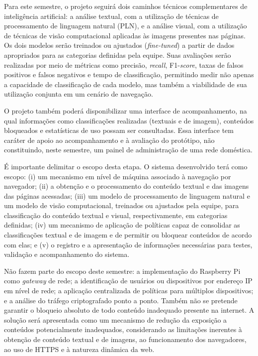 \documentclass[
    12pt,           %
    oneside,        %
    a4paper,        %
    chapter=TITLE,  %
    english,        %
    brazil          %
]{abntex2}
\begin{document}
Para este semestre, o projeto seguirá dois caminhos técnicos complementares
de inteligência artificial: a análise textual, com a utilização de técnicas
de processamento de linguagem natural (PLN), e a análise visual, com a
utilização de técnicas de visão computacional aplicadas às imagens presentes
nas páginas. Os dois modelos serão treinados ou ajustados
(\textit{fine-tuned}) a partir de dados apropriados para as categorias
definidas pela equipe. Suas avaliações serão realizadas por meio de métricas
como precisão, \textit{recall}, F1-\textit{score}, taxas de falsos positivos
e falsos negativos e tempo de classificação, permitindo medir não apenas a
capacidade de classificação de cada modelo, mas também a viabilidade de sua
utilização conjunta em um cenário de navegação.

O projeto também poderá disponibilizar uma interface de acompanhamento, na
qual informações como classificações realizadas (textuais e de imagem),
conteúdos bloqueados e estatísticas de uso possam ser consultadas. Essa
interface tem caráter de apoio ao acompanhamento e à avaliação do protótipo,
não constituindo, neste semestre, um painel de administração de uma rede
doméstica.

É importante delimitar o escopo desta etapa. O sistema desenvolvido terá como
escopo: (i) um mecanismo em nível de máquina associado à navegação por
navegador; (ii) a obtenção e o processamento do conteúdo textual e das
imagens das páginas acessadas; (iii) um modelo de processamento de linguagem
natural e um modelo de visão computacional, treinados ou ajustados pela
equipe, para classificação do conteúdo textual e visual, respectivamente, em
categorias definidas; (iv) um mecanismo de aplicação de políticas capaz de
consolidar as classificações textual e de imagem e de permitir ou bloquear
conteúdos de acordo com elas; e (v) o registro e a apresentação de
informações necessárias para testes, validação e acompanhamento do sistema.

Não fazem parte do escopo deste semestre: a implementação do Raspberry Pi como
\textit{gateway} de rede; a identificação de usuários ou dispositivos por
endereço IP em nível de rede; a aplicação centralizada de políticas para
múltiplos dispositivos; e a análise do tráfego criptografado ponto a ponto.
Também não se pretende garantir o bloqueio absoluto de todo conteúdo
inadequado presente na internet. A solução será apresentada como um mecanismo
de redução da exposição a conteúdos potencialmente inadequados, considerando
as limitações inerentes à obtenção de conteúdo textual e de imagens, ao
funcionamento dos navegadores, ao uso de HTTPS e à natureza dinâmica da web.
\end{document}
